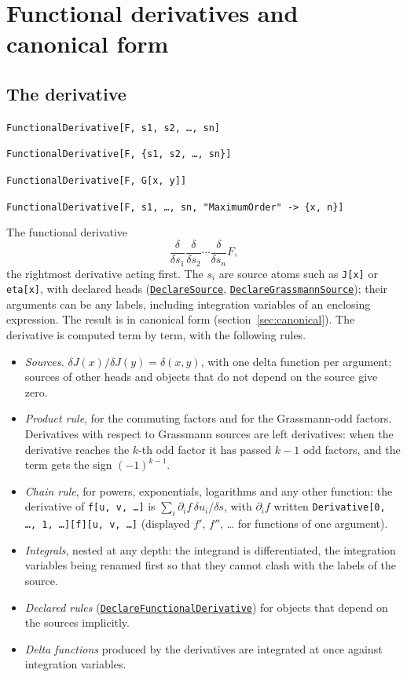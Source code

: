 \documentclass[11pt,a4paper]{article}
\makeatletter
\newcommand{\pkg}[1]{\texttt{#1}}
\newenvironment{function}[1]{\par\if@nobreak\else\medskip\needspace{4\baselineskip}\fi\noindent\phantomsection\label{fn:#1}%
  \begin{fnbox}}{\end{fnbox}\par\nobreak}
\newcommand{\syntax}[1]{\texttt{#1}\par}
\newcommand{\fnref}[1]{\hyperref[fn:#1]{\pkg{#1}}}
\makeatother
\begin{document}
\section{Functional derivatives and canonical form}\label{sec:derivatives}

\subsection{The derivative}

\begin{function}{FunctionalDerivative}
\syntax{FunctionalDerivative[F, s1, s2, \dots, sn]}
\syntax{FunctionalDerivative[F, \{s1, s2, \dots, sn\}]}
\syntax{FunctionalDerivative[F, G[x, y]]}
\syntax{FunctionalDerivative[F, s1, \dots, sn, "MaximumOrder" -> \{x, n\}]}
\end{function}
The functional derivative
\[
\frac{\delta}{\delta s_1}\frac{\delta}{\delta s_2}\cdots\frac{\delta}{\delta s_n}F ,
\]
the rightmost derivative acting first. The $s_i$ are source atoms such as \pkg{J[x]} or \pkg{eta[x]}, with declared heads
(\fnref{DeclareSource}, \fnref{DeclareGrassmannSource}); their arguments can be any labels, including integration
variables of an enclosing expression. The result is in canonical form (section~\ref{sec:canonical}). The derivative is
computed term by term, with the following rules.
\begin{itemize}
\item \emph{Sources.} $\delta J(x)/\delta J(y)=\delta(x,y)$, with one delta function per argument; sources of other heads
  and objects that do not depend on the source give zero.
\item \emph{Product rule}, for the commuting factors and for the Grassmann-odd factors. Derivatives with respect to
  Grassmann sources are left derivatives: when the derivative reaches the $k$-th odd factor it has passed $k-1$ odd
  factors, and the term gets the sign $(-1)^{k-1}$.
\item \emph{Chain rule}, for powers, exponentials, logarithms and any other function: the derivative of
  \pkg{f[u, v, \dots]} is $\sum_i \partial_i f\,\delta u_i/\delta s$, with $\partial_i f$ written
  \pkg{Derivative[0, \dots, 1, \dots][f][u, v, \dots]} (displayed $f'$, $f''$, \dots{} for functions of one argument).
\item \emph{Integrals}, nested at any depth: the integrand is differentiated, the integration variables being renamed
  first so that they cannot clash with the labels of the source.
\item \emph{Declared rules} (\fnref{DeclareFunctionalDerivative}) for objects that depend on the sources implicitly.
\item \emph{Delta functions} produced by the derivatives are integrated at once against integration variables.
\end{itemize}
\end{document}
